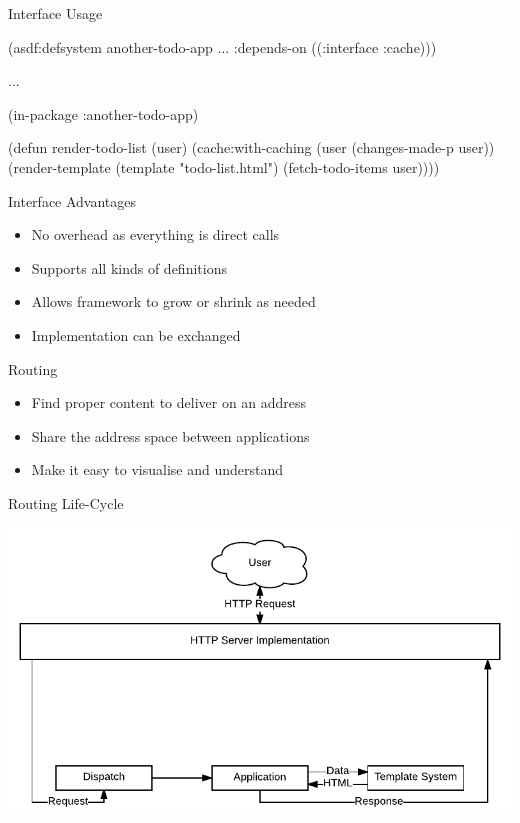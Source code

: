 \documentclass[14pt]{beamer}
\newcommand{\toptitle}[1]{
  {\huge #1} \\
  \vspace{0.2cm}
}
\begin{document}
\begin{frame}[fragile]
  \toptitle{Interface Usage}
\begin{lispcode}
(asdf:defsystem another-todo-app
  ...
  :depends-on ((:interface :cache)))

...

(in-package :another-todo-app)

(defun render-todo-list (user)
  (cache:with-caching (user (changes-made-p user))
    (render-template (template "todo-list.html")
                     (fetch-todo-items user))))
\end{lispcode}
\end{frame}

\begin{frame}
  \toptitle{Interface Advantages}
  \begin{itemize}
  \item No overhead as everything is direct calls
  \item Supports all kinds of definitions
  \item Allows framework to grow or shrink as needed
  \item Implementation can be exchanged
  \end{itemize}
\end{frame}

\begin{frame}
  \toptitle{Routing}
  \begin{itemize}
  \item Find proper content to deliver on an address
  \item Share the address space between applications
  \item Make it easy to visualise and understand
  \end{itemize}
\end{frame}

\begin{frame}
  \toptitle{Routing Life-Cycle}
  \includegraphics[width=\columnwidth]{request-simple}
\end{frame}
\end{document}
